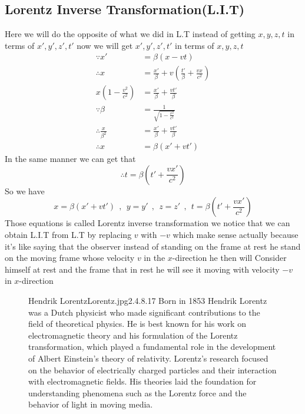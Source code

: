\subsection{Lorentz Inverse Transformation(L.I.T)}
Here we will do the opposite of what we did in L.T instead of getting $x,y,z,t$ in terms of $x' , y' , z' , t'$
now we will get $x' , y' , z' , t'$ in terms of $x,y,z,t$ 
\begin{align*}
    \because x' &= \beta(x-vt)\\
    \therefore x &= \frac{x'}{\beta} + v\left(\frac{t'}{\beta} + \frac{vx}{c^2}\right)\\
    x\left(1-\frac{v^2}{c^2}\right) &= \frac{x'}{\beta} + \frac{vt'}{\beta}    \\
    \because \beta &= \frac{1}{\sqrt{1-\frac{v^2}{c^2}}}\\
    \therefore \frac{x}{\beta^2} &= \frac{x'}{\beta} + \frac{vt'}{\beta}    \\
    \therefore x &= \beta(x'+vt')
\end{align*}
In the same manner we can get that 
\[
\therefore t =\beta\left(t' + \frac{vx'}{c^2}\right)
\]
So we have 
\[
        x= \beta(x'+vt')
        \ \ , \ \ 
        y = y'
        \ \ , \ \ 
        z = z'
        \ \ , \ \
        t =\beta\left(t' + \frac{vx'}{c^2}\right)
\]
Those equations is called Lorentz inverse transformation
we notice that we can obtain L.I.T from L.T by replacing $v$ with $-v$
which make sense actually because it's like saying that the observer instead of standing on the frame at rest he stand on the moving frame whose velocity $v$ in the $x$-direction he then will Consider himself at rest and the frame that in rest he will see it moving with velocity $-v$ in $x$-direction
\vspace*{\fill}
\begin{figure}[b]
    \begin{enrichment}{Hendrik Lorentz}{Lorentz.jpg}{2.4}{.8}{.17}
    Born in 1853 Hendrik Lorentz was a Dutch physicist who made significant contributions to the field of theoretical physics.
    He is best known for his work on electromagnetic theory and his formulation of the Lorentz transformation, which played a fundamental role in the development of Albert Einstein's theory of relativity. 
    Lorentz's research focused on the behavior of electrically charged particles and their interaction with electromagnetic fields. 
    His theories laid the foundation for understanding phenomena such as the Lorentz force and the behavior of light in moving media.
    \end{enrichment}
\end{figure}

